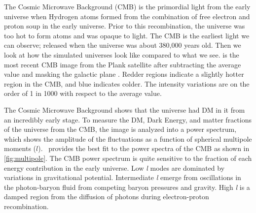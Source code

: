 The Cosmic Microwave Background (CMB) is the primordial light from the early universe when Hydrogen atoms formed from the combination of free electron and proton soup in the early universe.
Prior to this recombination, the universe was too hot to form atoms and was opaque to light.
The CMB is the earliest light we can observe; released when the universe was about 380,000 years old.
Then we look at how the simulated universes look like compared to what we see.
 is the most recent CMB image from the Plank satellite after subtracting the average value and masking the galactic plane \cite{Plank:CMB}.
Redder regions indicate a slightly hotter region in the CMB, and blue indicates colder.
The intensity variations are on the order of 1 in 1000 with respect to the average value.

\begin{figure}[ht]
\end{figure}

The Cosmic Microwave Background shows that the universe had DM in it from an incredibly early stage.
To measure the DM, Dark Energy, and matter fractions of the universe from the CMB, the image is analyzed into a power spectrum, which shows the amplitude of the fluctuations as a function of spherical multipole moments ($l$).
\lcdm~provides the best fit to the power spectra of the CMB as shown in \cref{fig:multipole}.
The CMB power spectrum is quite sensitive to the fraction of each energy contribution in the early universe.
Low \textit{l} modes are dominated by variations in gravitational potential.
Intermediate \textit{l} emerge from oscillations in the photon-baryon fluid from competing baryon pressures and gravity.
High \textit{l} is a damped region from the diffusion of photons during electron-proton recombination. \cite{Greene:cosmology_dm}

